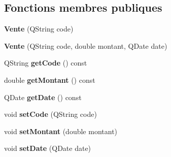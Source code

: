 \subsection*{Fonctions membres publiques}
\begin{DoxyCompactItemize}
\item 
\hypertarget{class_core_1_1_vente_a479f2669dd13f2eb62a543b874aef8b9}{
{\bfseries Vente} (QString code)}
\label{d9/d66/class_core_1_1_vente_a479f2669dd13f2eb62a543b874aef8b9}

\item 
\hypertarget{class_core_1_1_vente_a8ae390675f0c5beff6e7f74ff597af12}{
{\bfseries Vente} (QString code, double montant, QDate date)}
\label{d9/d66/class_core_1_1_vente_a8ae390675f0c5beff6e7f74ff597af12}

\item 
\hypertarget{class_core_1_1_vente_acc8ce82c4ed86bbcc0e7b187b497c3fd}{
QString {\bfseries getCode} () const }
\label{d9/d66/class_core_1_1_vente_acc8ce82c4ed86bbcc0e7b187b497c3fd}

\item 
\hypertarget{class_core_1_1_vente_a1b938be461750fcb6fa6b4b1630b623a}{
double {\bfseries getMontant} () const }
\label{d9/d66/class_core_1_1_vente_a1b938be461750fcb6fa6b4b1630b623a}

\item 
\hypertarget{class_core_1_1_vente_ab4498cdc8203b7c4fd1ae71730a0c014}{
QDate {\bfseries getDate} () const }
\label{d9/d66/class_core_1_1_vente_ab4498cdc8203b7c4fd1ae71730a0c014}

\item 
\hypertarget{class_core_1_1_vente_aaf0492f7bd78166842134da6c64fea4e}{
void {\bfseries setCode} (QString code)}
\label{d9/d66/class_core_1_1_vente_aaf0492f7bd78166842134da6c64fea4e}

\item 
\hypertarget{class_core_1_1_vente_a18eea1e317d5a2c203537a6fff850bdd}{
void {\bfseries setMontant} (double montant)}
\label{d9/d66/class_core_1_1_vente_a18eea1e317d5a2c203537a6fff850bdd}

\item 
\hypertarget{class_core_1_1_vente_a216e1d0533eb80d282a1b513e84aa3db}{
void {\bfseries setDate} (QDate date)}
\label{d9/d66/class_core_1_1_vente_a216e1d0533eb80d282a1b513e84aa3db}

\end{DoxyCompactItemize}
